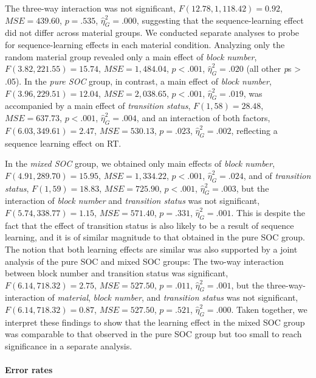 \documentclass[english,,man]{apa6}
\begin{document}
The three-way interaction was not significant,
\(F(12.78, 1,118.42) = 0.92\), \(\mathit{MSE} = 439.60\), \(p = .535\), \(\hat{\eta}^2_G = .000\), suggesting that the sequence-learning effect did not differ across material groups.
We conducted separate analyses to probe for sequence-learning effects in each material condition.
Analyzing only the random material group revealed only a main effect of \emph{block number}, \(F(3.82, 221.55) = 15.74\), \(\mathit{MSE} = 1,484.04\), \(p < .001\), \(\hat{\eta}^2_G = .020\) (all other \emph{p}s \textgreater{} .05).
In the \emph{pure SOC} group, in contrast, a main effect of \emph{block number},
\(F(3.96, 229.51) = 12.04\), \(\mathit{MSE} = 2,038.65\), \(p < .001\), \(\hat{\eta}^2_G = .019\),
was accompanied by a main effect of \emph{transition status},
\(F(1, 58) = 28.48\), \(\mathit{MSE} = 637.73\), \(p < .001\), \(\hat{\eta}^2_G = .004\),
and an interaction of both factors,
\(F(6.03, 349.61) = 2.47\), \(\mathit{MSE} = 530.13\), \(p = .023\), \(\hat{\eta}^2_G = .002\),
reflecting a sequence learning effect on RT.

In the \emph{mixed SOC} group, we obtained only main effects of \emph{block number},
\(F(4.91, 289.70) = 15.95\), \(\mathit{MSE} = 1,334.22\), \(p < .001\), \(\hat{\eta}^2_G = .024\),
and of \emph{transition status},
\(F(1, 59) = 18.83\), \(\mathit{MSE} = 725.90\), \(p < .001\), \(\hat{\eta}^2_G = .003\),
but the interaction of \emph{block number} and \emph{transition status} was not significant,
\(F(5.74, 338.77) = 1.15\), \(\mathit{MSE} = 571.40\), \(p = .331\), \(\hat{\eta}^2_G = .001\).
This is despite the fact that the effect of transition status is also likely to be a result of sequence learning, and it is of similar magnitude to that obtained in the pure SOC group.
The notion that both learning effects are similar was also supported by a joint analysis of the pure SOC and mixed SOC groups:
The two-way interaction between block number and transition status was significant, \(F(6.14, 718.32) = 2.75\), \(\mathit{MSE} = 527.50\), \(p = .011\), \(\hat{\eta}^2_G = .001\),
but the three-way-interaction of \emph{material}, \emph{block number}, and \emph{transition status} was not significant,
\(F(6.14, 718.32) = 0.87\), \(\mathit{MSE} = 527.50\), \(p = .521\), \(\hat{\eta}^2_G = .000\).
Taken together, we interpret these findings to show that the learning effect in the mixed SOC group was comparable to that observed in the pure SOC group but too small to reach significance in a separate analysis.

\hypertarget{error-rates-2}{%
\paragraph{Error rates}\label{error-rates-2}}
\end{document}
